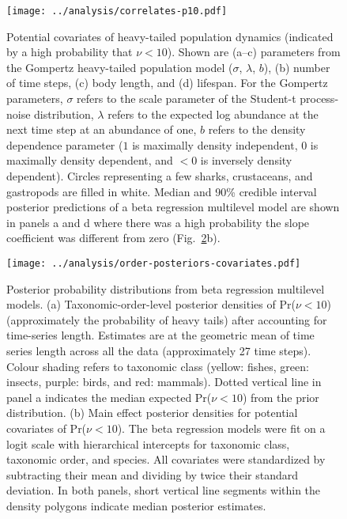 \begin{figure}[htbp]
\begin{center}
\texttt{[image: ../analysis/correlates-p10.pdf]}

\caption{Potential covariates of heavy-tailed population dynamics (indicated
  by a high probability that $\nu < 10$). Shown are (a--c) parameters from the
  Gompertz heavy-tailed population model ($\sigma$, $\lambda$, $b$), (b)
  number of time steps, (c) body length, and (d) lifespan. For the Gompertz
  parameters, $\sigma$ refers to the scale parameter of the Student-t
  process-noise distribution, $\lambda$ refers to the expected log abundance
  at the next time step at an abundance of one, $b$ refers to the density
  dependence parameter ($1$ is maximally density independent, $0$ is maximally
  density dependent, and $<0$ is inversely density dependent). Circles
  representing a few sharks, crustaceans, and gastropods are filled in white.
  Median and 90\% credible interval posterior predictions of a beta regression
  multilevel model are shown in panels a and d where there was a high
  probability the slope coefficient was different from zero
  (Fig.~\ref{fig:posteriors}b).}

\label{fig:correlates}
\end{center}
\end{figure}

\begin{figure}[htbp]
\begin{center}
\texttt{[image: ../analysis/order-posteriors-covariates.pdf]}

\caption{Posterior probability distributions from beta regression multilevel
  models. (a) Taxonomic-order-level posterior densities of Pr($\nu < 10$)
  (approximately the probability of heavy tails) after accounting for
  time-series length. Estimates are at the geometric mean of time series
  length across all the data (approximately 27 time steps). Colour shading
  refers to taxonomic class (yellow: fishes, green: insects, purple: birds,
  and red: mammals). Dotted vertical line in panel a indicates the median
  expected Pr($\nu < 10$) from the prior distribution. (b) Main effect
  posterior densities for potential covariates of Pr($\nu < 10$). The beta
  regression models were fit on a logit scale with hierarchical intercepts for
  taxonomic class, taxonomic order, and species. All covariates were
  standardized by subtracting their mean and dividing by twice their standard
  deviation. In both panels, short vertical line segments within the density
  polygons indicate median posterior estimates.}

\label{fig:posteriors}
\end{center}
\end{figure}

